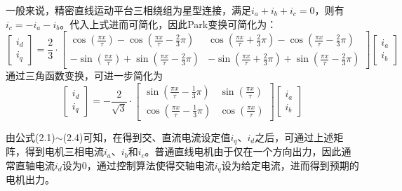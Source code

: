 一般来说，精密直线运动平台三相绕组为星型连接，满足$i_a+i_b+i_c=0$，则有$i_c=-i_a-i_b$。代入上式进而可简化，因此Park变换可简化为：
\begin{equation}
\begin{bmatrix}
i_{d}\\
i_{q}
\end{bmatrix}=\frac{2}{3}\cdot
\begin{bmatrix}
\cos \left(\frac{\pi x}{\tau}\right)-\cos \left(\frac{\pi x}{\tau}-\frac{2}{3}\pi\right) & \cos \left(\frac{\pi x}{\tau}+\frac{2}{3}\pi\right)-\cos \left(\frac{\pi x}{\tau}-\frac{2}{3}\pi\right) \\
-\sin \left(\frac{\pi x}{\tau}\right)+\sin \left(\frac{\pi x}{\tau}-\frac{2}{3}\pi\right) & -\sin \left(\frac{\pi x}{\tau}+\frac{2}{3}\pi\right)+\sin \left(\frac{\pi x}{\tau}-\frac{2}{3}\pi\right)
\end{bmatrix}
\begin{bmatrix}
i_{a} \\
i_{b}
\end{bmatrix}
\end{equation}
通过三角函数变换，可进一步简化为
\begin{equation}
\begin{bmatrix}
i_{d} \\
i_{q}
\end{bmatrix}=-\frac{2}{\sqrt{3}} \cdot
\begin{bmatrix}
\sin \left(\frac{\pi x}{\tau}-\frac{1}{3}\pi\right) & \sin \left(\frac{\pi x}{\tau}\right) \\
\cos \left(\frac{\pi x}{\tau}-\frac{1}{3} \pi\right) & \cos \left(\frac{\pi x}{\tau}\right)
\end{bmatrix}
\begin{bmatrix}
i_{a} \\
i_{b}
\end{bmatrix}
\end{equation}

由公式(2.1)$\sim$(2.4)可知，在得到交、直流电流设定值$i_q$、$i_d$之后，可通过上述矩阵，得到电机三相电流$i_a$、$i_b$和$i_c$。普通直线电机由于仅在一个方向出力，因此通常直轴电流$i_d$设为0，通过控制算法使得交轴电流$i_q$设为给定电流，进而得到预期的电机出力。

